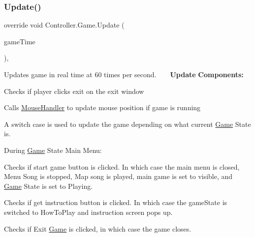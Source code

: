 \subsubsection{\texorpdfstring{Update()}{Update()}}
{\footnotesize\ttfamily override void Controller.\+Game.\+Update (\begin{DoxyParamCaption}\item[{Game\+Time}]{game\+Time }\end{DoxyParamCaption})\hspace{0.3cm}{\ttfamily [inline]}, {\ttfamily [protected]}}

Updates game in real time at 60 times per second. ~\newline
~\newline
 {\bfseries Update} {\bfseries Components\+:} 
\begin{DoxyItemize}
\item Checks if player clicks exit on the exit window ~\newline

\item Calls \hyperlink{class_controller_1_1_mouse_handler}{Mouse\+Handler} to update mouse position if game is running ~\newline

\item A switch case is used to update the game depending on what current \hyperlink{class_controller_1_1_game}{Game} State is. ~\newline

\item During \hyperlink{class_controller_1_1_game}{Game} State Main Menu\+: ~\newline

\begin{DoxyEnumerate}
\item Checks if start game button is clicked. In which case the main menu is closed, Menu Song is stopped, Map song is played, main game is set to visible, and \hyperlink{class_controller_1_1_game}{Game} State is set to Playing. ~\newline

\item Checks if get instruction button is clicked. In which case the game\+State is switched to How\+To\+Play and instruction screen pops up. ~\newline

\item Checks if Exit \hyperlink{class_controller_1_1_game}{Game} is clicked, in which case the game closes. ~\newline


\end{DoxyEnumerate}
\end{DoxyItemize}
